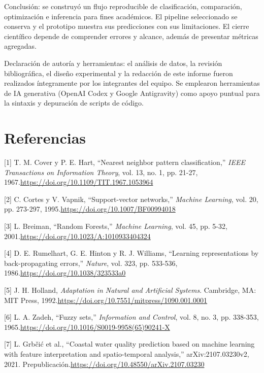 \documentclass[12pt,a4paper]{article}
\begin{document}
Conclusión: se construyó un flujo reproducible de clasificación, comparación, optimización e inferencia para fines académicos. El pipeline seleccionado se conserva y el prototipo muestra sus predicciones con sus limitaciones. El cierre científico depende de comprender errores y alcance, además de presentar métricas agregadas.

Declaración de autoría y herramientas: el análisis de datos, la revisión bibliográfica, el diseño experimental y la redacción de este informe fueron realizados íntegramente por los integrantes del equipo. Se emplearon herramientas de IA generativa (OpenAI Codex y Google Antigravity) como apoyo puntual para la sintaxis y depuración de scripts de código.

\clearpage
\section*{Referencias}
[1] T. M. Cover y P. E. Hart, ``Nearest neighbor pattern classification,'' \textit{IEEE Transactions on Information Theory}, vol. 13, no. 1, pp. 21-27, 1967.\newline \url{https://doi.org/10.1109/TIT.1967.1053964}

[2] C. Cortes y V. Vapnik, ``Support-vector networks,'' \textit{Machine Learning}, vol. 20, pp. 273-297, 1995.\newline \url{https://doi.org/10.1007/BF00994018}

[3] L. Breiman, ``Random Forests,'' \textit{Machine Learning}, vol. 45, pp. 5-32, 2001.\newline \url{https://doi.org/10.1023/A:1010933404324}

[4] D. E. Rumelhart, G. E. Hinton y R. J. Williams, ``Learning representations by back-propagating errors,'' \textit{Nature}, vol. 323, pp. 533-536, 1986.\newline \url{https://doi.org/10.1038/323533a0}

[5] J. H. Holland, \textit{Adaptation in Natural and Artificial Systems}. Cambridge, MA: MIT Press, 1992.\newline \url{https://doi.org/10.7551/mitpress/1090.001.0001}

[6] L. A. Zadeh, ``Fuzzy sets,'' \textit{Information and Control}, vol. 8, no. 3, pp. 338-353, 1965.\newline \url{https://doi.org/10.1016/S0019-9958(65)90241-X}

[7] L. Grb\v{c}i\'{c} et al., ``Coastal water quality prediction based on machine learning with feature interpretation and spatio-temporal analysis,'' arXiv:2107.03230v2, 2021. Prepublicación.\newline \url{https://doi.org/10.48550/arXiv.2107.03230}
\end{document}
